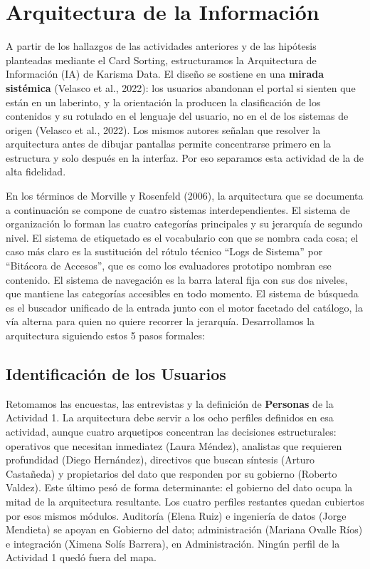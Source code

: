 \section{Arquitectura de la Información}

A partir de los hallazgos de las actividades anteriores y de las hipótesis planteadas mediante el Card Sorting, estructuramos la Arquitectura de Información (IA) de Karisma Data. El diseño se sostiene en una \textbf{mirada sistémica} (Velasco et al., 2022): los usuarios abandonan el portal si sienten que están en un laberinto, y la orientación la producen la clasificación de los contenidos y su rotulado en el lenguaje del usuario, no en el de los sistemas de origen (Velasco et al., 2022). Los mismos autores señalan que resolver la arquitectura antes de dibujar pantallas permite concentrarse primero en la estructura y solo después en la interfaz. Por eso separamos esta actividad de la de alta fidelidad.

En los términos de Morville y Rosenfeld (2006), la arquitectura que se documenta a continuación se compone de cuatro sistemas interdependientes. El sistema de organización lo forman las cuatro categorías principales y su jerarquía de segundo nivel. El sistema de etiquetado es el vocabulario con que se nombra cada cosa; el caso más claro es la sustitución del rótulo técnico ``Logs de Sistema'' por ``Bitácora de Accesos'', que es como los evaluadores prototipo nombran ese contenido. El sistema de navegación es la barra lateral fija con sus dos niveles, que mantiene las categorías accesibles en todo momento. El sistema de búsqueda es el buscador unificado de la entrada junto con el motor facetado del catálogo, la vía alterna para quien no quiere recorrer la jerarquía. Desarrollamos la arquitectura siguiendo estos 5 pasos formales:

\subsection{Identificación de los Usuarios}
Retomamos las encuestas, las entrevistas y la definición de \textbf{Personas} de la Actividad 1. La arquitectura debe servir a los ocho perfiles definidos en esa actividad, aunque cuatro arquetipos concentran las decisiones estructurales: operativos que necesitan inmediatez (Laura Méndez), analistas que requieren profundidad (Diego Hernández), directivos que buscan síntesis (Arturo Castañeda) y propietarios del dato que responden por su gobierno (Roberto Valdez). Este último pesó de forma determinante: el gobierno del dato ocupa la mitad de la arquitectura resultante. Los cuatro perfiles restantes quedan cubiertos por esos mismos módulos. Auditoría (Elena Ruiz) e ingeniería de datos (Jorge Mendieta) se apoyan en Gobierno del dato; administración (Mariana Ovalle Ríos) e integración (Ximena Solís Barrera), en Administración. Ningún perfil de la Actividad 1 quedó fuera del mapa.

